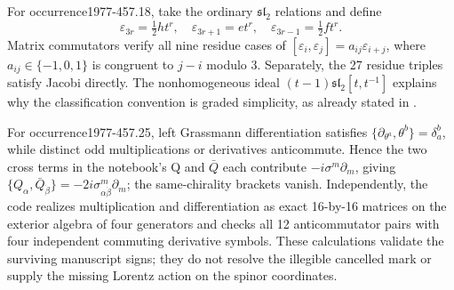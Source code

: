 \begin{remark}\oursComputed
For occurrence1977-457.18, take the ordinary \(\mathfrak{sl}_2\)
relations and define
\[
 \varepsilon_{3r}=\tfrac12ht^r,\quad
 \varepsilon_{3r+1}=et^r,\quad
 \varepsilon_{3r-1}=\tfrac12ft^r.
\]
Matrix commutators verify all nine residue cases of
\([\varepsilon_i,\varepsilon_j]=a_{ij}\varepsilon_{i+j}\),
where \(a_{ij}\in\{-1,0,1\}\) is congruent to \(j-i\) modulo 3.
Separately, the 27 residue triples satisfy Jacobi directly. The
nonhomogeneous ideal \((t-1)\mathfrak{sl}_2[t,t^{-1}]\) explains why
the classification convention is graded simplicity, as already stated
in \citet[Introduction]{kac1968graded}.

For occurrence1977-457.25, left Grassmann differentiation satisfies
\(\{\partial_{\theta^a},\theta^b\}=\delta_a^b\), while distinct
odd multiplications or derivatives anticommute. Hence the two cross
terms in the notebook's Q and \(\bar Q\) each contribute
\(-i\sigma^m\partial_m\), giving
\(\{Q_\alpha,\bar Q_{\dot\beta}\}=-2i\sigma^m_{\alpha\dot\beta}
\partial_m\); the same-chirality brackets vanish. Independently,
the code realizes multiplication and differentiation as exact 16-by-16
matrices on the exterior algebra of four generators and checks all 12
anticommutator pairs with four independent commuting derivative
symbols. These calculations validate the surviving manuscript signs;
they do not resolve the illegible cancelled mark or supply the missing
Lorentz action on the spinor coordinates.
\end{remark}
